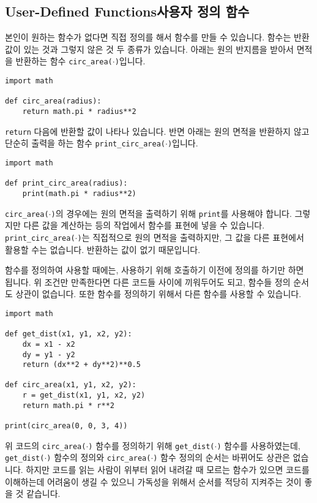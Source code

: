 \documentclass[../main.tex]{subfiles}
\begin{document}
\subsection{User-Defined Functions사용자 정의 함수}
본인이 원하는 함수가 없다면 직접 정의를 해서 함수를 만들 수 있습니다.
함수는 반환 값이 있는 것과 그렇지 않은 것 두 종류가 있습니다.
아래는 원의 반지름을 받아서 면적을 반환하는 함수
\texttt{circ\_area($\cdot$)}입니다.
\begin{verbatim}
import math

def circ_area(radius):
    return math.pi * radius**2
\end{verbatim}
\texttt{return} 다음에 반환할 값이 나타나 있습니다.
반면 아래는 원의 면적을 반환하지 않고 단순히 출력을 하는 함수
\texttt{print\_circ\_area($\cdot$)}입니다.
\begin{verbatim}
import math

def print_circ_area(radius):
    print(math.pi * radius**2)
\end{verbatim}
\texttt{circ\_area($\cdot$)}의 경우에는 원의 면적을 출력하기 위해
\texttt{print}를 사용해야 합니다.  그렇지만 다른 값을 계산하는 등의 작업에서
함수를 표현에 넣을 수 있습니다.  \texttt{print\_circ\_area($\cdot$)}는
직접적으로 원의 면적을 출력하지만, 그 값을 다른 표현에서 활용할 수는 없습니다.
반환하는 값이 없기 때문입니다.

함수를 정의하여 사용할 때에는, 사용하기 위해 호출하기 이전에 정의를 하기만 하면
됩니다.  위 조건만 만족한다면 다른 코드들 사이에 끼워두어도 되고, 함수들 정의
순서도 상관이 없습니다.  또한 함수를 정의하기 위해서 다른 함수를 사용할 수
있습니다.
\begin{verbatim}
import math

def get_dist(x1, y1, x2, y2):
    dx = x1 - x2
    dy = y1 - y2
    return (dx**2 + dy**2)**0.5

def circ_area(x1, y1, x2, y2):
    r = get_dist(x1, y1, x2, y2)
    return math.pi * r**2

print(circ_area(0, 0, 3, 4))
\end{verbatim}
위 코드의 \texttt{circ\_area($\cdot$)} 함수를 정의하기 위해
\texttt{get\_dist($\cdot$)} 함수를 사용하였는데, \texttt{get\_dist($\cdot$)}
함수의 정의와 \texttt{circ\_area($\cdot$)} 함수 정의의 순서는 바뀌어도 상관은
없습니다.  하지만 코드를 읽는 사람이 위부터 읽어 내려갈 때 모르는 함수가 있으면
코드를 이해하는데 어려움이 생길 수 있으니 가독성을 위해서 순서를 적당히
지켜주는 것이 좋을 것 같습니다.
\end{document}
